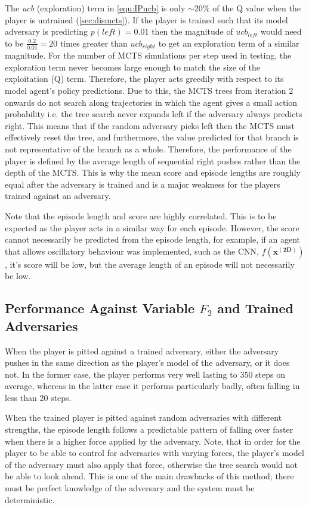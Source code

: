 \documentclass[../main.tex]{subfiles}
\begin{document}
The \textit{ucb} (exploration) term in \cref{equ:IPucb}
is only $\sim 20\%$ of the Q value when the player is untrained (\cref{sec:dismcts}). If the player is trained such that its model adversary is predicting $p(left) = 0.01$ then the magnitude of $ucb_{left}$ would need to be $\frac{0.2}{0.01} = 20$ times greater than $ucb_{right}$ to get an exploration term of a similar magnitude. For the number of MCTS simulations per step used in testing, the exploration term never becomes large enough to match the size of the exploitation (Q) term. Therefore, the player acts greedily with respect to its model agent's policy predictions. Due to this, the MCTS trees from iteration 2 onwards do not search along trajectories in which the agent gives a small action probability i.e. the tree search never expands left if the adversary always predicts right. This means that if the random adversary picks left then the MCTS must effectively reset the tree, and furthermore, the value predicted for that branch is not representative of the branch as a whole. Therefore, the performance of the player is defined by the average length of sequential right pushes rather than the depth of the MCTS. This is why the mean score and episode lengths are roughly equal after the adversary is trained and is a major weakness for the players trained against an adversary.

Note that the episode length and score are highly correlated. This is to be expected as the player acts in a similar way for each episode. However, the score cannot necessarily be predicted from the episode length, for example, if an agent that allows oscillatory behaviour was implemented, such as the CNN, $f(\boldsymbol{x^{(2D)}})$, it's score will be low, but the average length of an episode will not necessarily be low.

\subsection{Performance Against Variable $F_2$ and Trained Adversaries}

When the player is pitted against a trained adversary, either the adversary pushes in the same direction as the player's model of the adversary, or it does not. In the former case, the player performs very well lasting to 350 steps on average, whereas in the latter case it performs particularly badly, often falling in less than 20 steps.

When the trained player is pitted against random adversaries with different strengths, the episode length follows a predictable pattern of falling over faster when there is a higher force applied by the adversary. Note, that in order for the player to be able to control for adversaries with varying forces, the player's model of the adversary must also apply that force, otherwise the tree search would not be able to look ahead. This is one of the main drawbacks of this method; there must be perfect knowledge of the adversary and the system must be deterministic.
\end{document}
